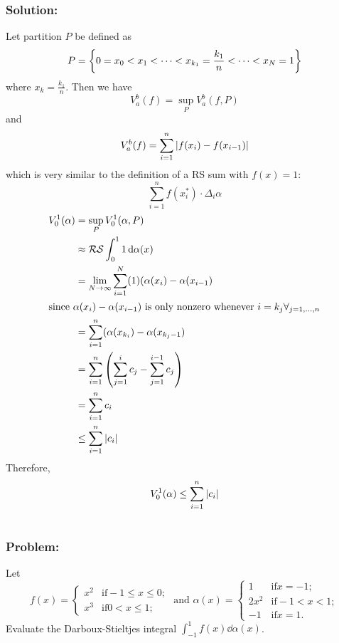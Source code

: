 \documentclass[]{article}
\begin{document}
\subsubsection*{Solution:}
Let partition $P$ be defined as \[
    P = \qty{
        0 = x_0 < x_1 < \cdots < x_{k_1} = \frac{k_1}{n} < \cdots < x_N = 1
    }
\] where $x_{k} = \frac{k_1}{n}$.
Then we have \[
    V_{a}^{b}(f) = \sup_P V_{a}^{b}(f,P)
\] and \[
    V_a^b(f) = \sum_{i=1}^{n} \abs{f(x_i) - f(x_{i-1})}
\] which is very similar to the definition of a RS sum with $f(x) = 1$:\[
    \sum_{i=1}^{n} f(x_i^*) \cdot \Delta_i \alpha
\]
\begin{align*}
    V_{0}^{1}(\alpha) &= \sup_P V_{0}^{1}(\alpha,P)\\
        &\approx \mathcal{RS} \int_{0}^{1} 1 \dd{\alpha(x)}\\
        &= \lim_{N \to \infty} \sum_{i=1}^{N} (1) (\alpha(x_i) - \alpha(x_{i-1})\\
    \intertext{since $\alpha(x_i) - \alpha(x_{i-1})$ is only nonzero whenever $i = k_j \forall_{j=1,\dots,n}$}
        &= \sum_{i=1}^{n} (\alpha(x_{k_i}) - \alpha(x_{k_j-1})\\
        &= \sum_{i=1}^{n} \qty(\sum_{j=1}^{i} c_j - \sum_{j=1}^{i-1} c_{j})\\
        &= \sum_{i=1}^{n} c_i\\
        &\leq \sum_{i=1}^{n} \abs{c_i}
\end{align*}
Therefore,\[
    V_{0}^{1}(\alpha) \leq \sum_{i=1}^{n} \abs{c_i}
\]

\newpage
\section{}
\subsubsection*{Problem:}
Let \[
    f(x) = \begin{cases}
        x^2 &\text{if} -1 \leq x \leq 0;\\
        x^3 &\text{if} 0 < x \leq 1;
    \end{cases}
    \text{ and } 
    \alpha(x) = \begin{cases}
        1   &\text{if} x = -1;\\
        2 x^2   &\text{if} -1 < x < 1;\\
        -1  &\text{if} x = 1.
    \end{cases}
\]
Evaluate the Darboux-Stieltjes integral $\int_{-1}^{1} f(x) \dd{\alpha(x)}$.
\end{document}
